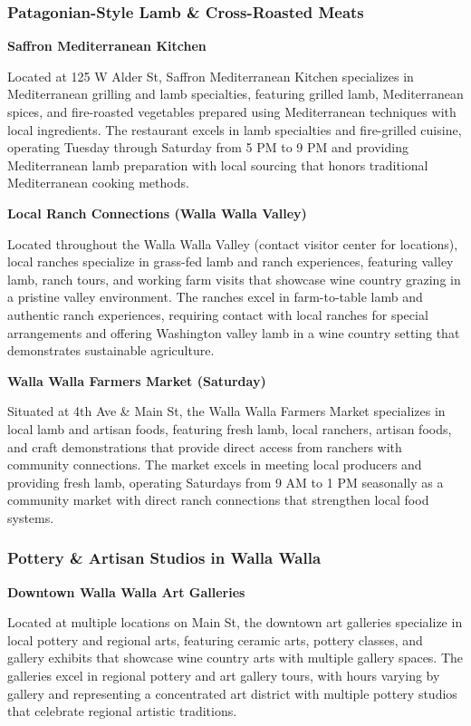 \documentclass[
  11pt,
  letterpaper,
  DIV=10,
  numbers=noendperiod]{scrartcl}
\begin{document}
\subsubsection{Patagonian-Style Lamb \& Cross-Roasted
Meats}\label{patagonian-style-lamb-cross-roasted-meats-3}

\textbf{Saffron Mediterranean Kitchen}

Located at 125 W Alder St, Saffron Mediterranean Kitchen specializes in
Mediterranean grilling and lamb specialties, featuring grilled lamb,
Mediterranean spices, and fire-roasted vegetables prepared using
Mediterranean techniques with local ingredients. The restaurant excels
in lamb specialties and fire-grilled cuisine, operating Tuesday through
Saturday from 5 PM to 9 PM and providing Mediterranean lamb preparation
with local sourcing that honors traditional Mediterranean cooking
methods.

\textbf{Local Ranch Connections (Walla Walla Valley)}

Located throughout the Walla Walla Valley (contact visitor center for
locations), local ranches specialize in grass-fed lamb and ranch
experiences, featuring valley lamb, ranch tours, and working farm visits
that showcase wine country grazing in a pristine valley environment. The
ranches excel in farm-to-table lamb and authentic ranch experiences,
requiring contact with local ranches for special arrangements and
offering Washington valley lamb in a wine country setting that
demonstrates sustainable agriculture.

\textbf{Walla Walla Farmers Market (Saturday)}

Situated at 4th Ave \& Main St, the Walla Walla Farmers Market
specializes in local lamb and artisan foods, featuring fresh lamb, local
ranchers, artisan foods, and craft demonstrations that provide direct
access from ranchers with community connections. The market excels in
meeting local producers and providing fresh lamb, operating Saturdays
from 9 AM to 1 PM seasonally as a community market with direct ranch
connections that strengthen local food systems.

\subsubsection{Pottery \& Artisan Studios in Walla
Walla}\label{pottery-artisan-studios-in-walla-walla}

\textbf{Downtown Walla Walla Art Galleries}

Located at multiple locations on Main St, the downtown art galleries
specialize in local pottery and regional arts, featuring ceramic arts,
pottery classes, and gallery exhibits that showcase wine country arts
with multiple gallery spaces. The galleries excel in regional pottery
and art gallery tours, with hours varying by gallery and representing a
concentrated art district with multiple pottery studios that celebrate
regional artistic traditions.
\end{document}
